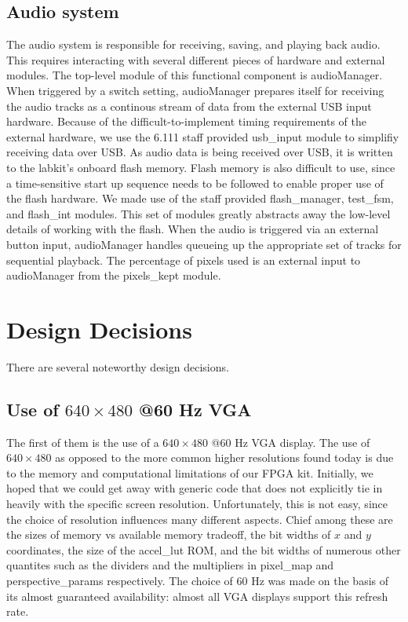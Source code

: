 \documentclass{article}
\begin{document}
\subsection{Audio system}
The audio system is responsible for receiving, saving, and playing back audio.
This requires interacting with several different pieces of hardware and external modules.
The top-level module of this functional component is audioManager.
When triggered by a switch setting, audioManager prepares itself for receiving the audio tracks as a continous stream of data from the external USB input hardware.
Because of the difficult-to-implement timing requirements of the external hardware, we use the 6.111 staff provided usb\_input module to simplifiy receiving data over USB.
As audio data is being received over USB, it is written to the labkit's onboard flash memory.
Flash memory is also difficult to use, since a time-sensitive start up sequence needs to be followed to enable proper use of the flash hardware.
We made use of the staff provided flash\_manager, test\_fsm, and flash\_int modules. This set of modules greatly abstracts away the low-level details of working with the flash.
When the audio is triggered via an external button input, audioManager handles queueing up the appropriate set of tracks for sequential playback. The percentage of pixels used is an external input to audioManager from the pixels\_kept module.

\section{Design Decisions}

There are several noteworthy design decisions.

\subsection{Use of $640 \times 480$ @60 Hz VGA}
The first of them is the use of a $640 \times 480$ @60 Hz VGA display.
The use of $640 \times 480$  as opposed to the more common higher resolutions found today is due to the memory and computational limitations of our FPGA kit.
Initially, we hoped that we could get away with generic code that does not explicitly tie in heavily with the specific screen resolution.
Unfortunately, this is not easy, since the choice of resolution influences many different aspects.
Chief among these are the sizes of memory vs available memory tradeoff, the bit widths of $x$ and $y$ coordinates, the size of the accel\_lut ROM,
and the bit widths of numerous other quantites such as the dividers and the multipliers in pixel\_map and perspective\_params respectively.
The choice of 60 Hz was made on the basis of its almost guaranteed availability: almost all VGA displays support this refresh rate.
\end{document}
